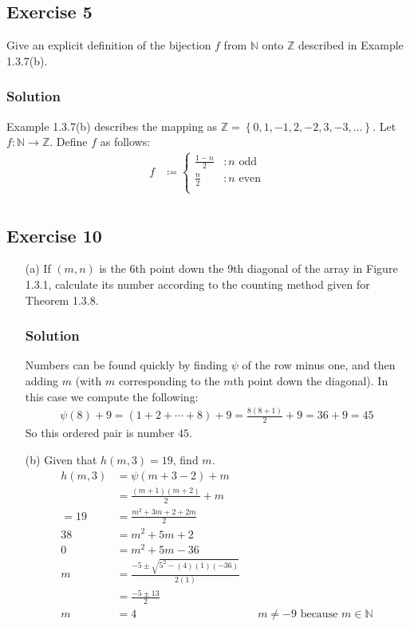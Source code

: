 \documentclass[12pt]{article}
\begin{document}
\subsection*{Exercise 5}
Give an explicit definition of the bijection $f$ from $\mathbb{N}$ onto $\mathbb{Z}$ described in Example 1.3.7(b).
\subsubsection*{Solution}
Example 1.3.7(b) describes the mapping as $\mathbb{Z} = \left\{0, 1, -1, 2, -2, 3, -3, \dots\right\}$. Let $f : \mathbb{N} \to \mathbb{Z}$. Define $f$ as follows:
\begin{align*}
f &\coloneqq \left\{
\begin{array}{lr}
\frac{1 - n}{2} & : n \text{ odd} \\
\frac{n}{2} & : n \text{ even} \\
\end{array}
\right. \\
\end{align*}
\subsection*{Exercise 10}
\begin{itemize}
\item[(a)] If $\left(m, n\right)$ is the 6th point down the 9th diagonal of the array in Figure 1.3.1, calculate its number according to the counting method given for Theorem 1.3.8.
\subsubsection*{Solution}
Numbers can be found quickly by finding $\psi$ of the row minus one, and then adding $m$ (with $m$ corresponding to the $m$th point down the diagonal). In this case we compute the following:
\begin{align*}
\psi\left(8\right) + 9 = \left(1 + 2 + \cdots + 8\right) + 9 = \frac{8\left(8 + 1\right)}{2} + 9 = 36 + 9 = 45
\end{align*}
So this ordered pair is number $45$.

\item[(b)] Given that $h\left(m, 3\right) = 19$, find $m$.
\begin{align*}
h\left(m, 3\right) &= \psi\left(m + 3 - 2\right) + m \\
&= \frac{\left(m + 1\right)\left(m + 2\right)}{2} + m \\
= 19 &= \frac{m^2 + 3m + 2 + 2m}{2} \\
38 &= m^2 + 5m + 2 \\
0 &= m^2 + 5m - 36 \\
m &= \frac{-5 \pm \sqrt{5^2 - (4)(1)\left(-36\right)}}{2(1)} \\
&= \frac{-5 \pm 13}{2} \\
m &= 4 && m \neq -9\text{ because } m \in \mathbb{N}
\end{align*}
\end{itemize}
\end{document}
